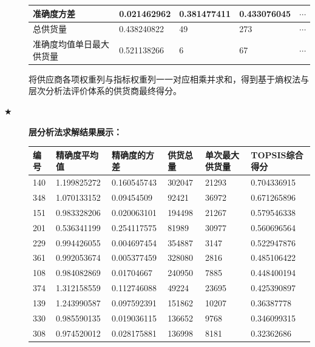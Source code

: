 \documentclass{cumcmthesis}
\begin{document}
\begin{description}
\begin{table}[htbp]
\begin{tabular}{|l|l|l|l|l|}
                \hline
                准确度方差               & 0.021462962 & 0.381477411 & 0.433076045 & $\cdots$ \\
                \hline
                总供货量                 & 0.438240822 & 49          & 273         & $\cdots$ \\
                \hline
                准确度均值单日最大供货量 & 0.521138266 & 6           & 67          & $\cdots$ \\
                \hline
            \end{tabular}
        \end{table}
        将供应商各项权重列与指标权重列一一对应相乘并求和，得到基于熵权法与层次分析法评价体系的供货商最终得分。

    \item[$\bigstar$] \textbf{层分析法求解结果展示：}
        \begin{longtable}{l|llll|l}
            \toprule
            编号 & 精确度平均值 & 精确度的方差 & 供货总量 & 单次最大供货量 & TOPSIS综合得分 \\
            \midrule
            140  & 1.199825272  & 0.160545743  & 302047   & 21293          & 0.704336915    \\
            348  & 1.070133152  & 0.09454509   & 92421    & 36972          & 0.671265896    \\
            151  & 0.983328206  & 0.020063101  & 194498   & 21267          & 0.579546338    \\
            201  & 0.536341199  & 0.254117575  & 81989    & 30977          & 0.560696564    \\
            229  & 0.994426055  & 0.004697454  & 354887   & 3147           & 0.522947876    \\
            361  & 0.992053674  & 0.005377459  & 328080   & 2816           & 0.485106422    \\
            108  & 0.984082869  & 0.01704667   & 240950   & 7885           & 0.448400194    \\
            374  & 1.312158559  & 0.112746088  & 49224    & 23695          & 0.425390897    \\
            139  & 1.243990587  & 0.097592391  & 151862   & 10207          & 0.36387778     \\
            330  & 0.985590135  & 0.019036115  & 136652   & 9768           & 0.346099315    \\
            308  & 0.974520012  & 0.028175881  & 136998   & 8181           & 0.32362686     \\

\end{longtable}
\end{description}
\end{document}
